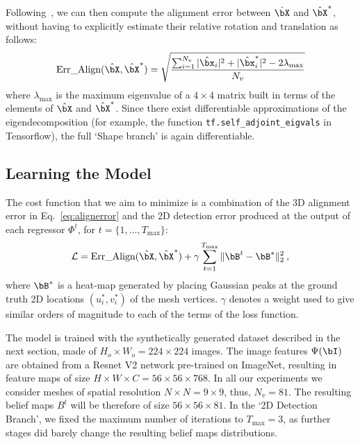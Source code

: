 \documentclass[10pt,twocolumn,letterpaper]{article}
\begin{document}
Following~\cite{coutsias2004using}, we can then compute the alignment error between $\hat{\bX}$ and $\hat{\bX}^*$, without having to explicitly estimate their relative rotation and translation as follows:
\begin{equation}
\textrm{Err\_Align}(\hat{\bX},\hat{\bX}^*) = \sqrt{\frac{\sum_{i=1}^{N_v} |\hat{\bx}_i|^2 + |\hat{\bx}_i^*|^2 - 2\lambda_{\textrm{max}}   }{N_v}}
\label{eq:alignerror}
\end{equation}
where $\lambda_{\textrm{max}}$ is the maximum eigenvalue of a $4\times 4$ matrix built in terms of the elements of $\hat{\bX}$ and $\hat{\bX}^*$.  Since there exist differentiable approximations of the eigendecomposition (for example, the function \texttt{tf.self\_adjoint\_eigvals} in Tensorflow), the full `Shape branch' is again differentiable.

\subsection{Learning the Model}
The cost function that we aim to minimize is a combination of the 3D alignment error in Eq.~\eqref{eq:alignerror} and the 2D detection error produced at the output of each regressor $\Phi^t$, for $t=\{1,\ldots,T_{\textrm{max}}\}$:
\begin{equation}
\mathcal{L}=\textrm{Err\_Align}(\hat{\bX},\hat{\bX}^*)+ \gamma \sum_{t=1}^{T_{\textrm{max}}}\|\bB^t-\bB^* \|_2^2 \> ,
\label{eq:loss}
\end{equation}
where $\bB^*$ is a heat-map generated by placing Gaussian peaks at the ground truth 2D locations $(u_i^*,v_i^*)$ of the mesh vertices. $\gamma$ denotes a weight used to give similar orders of magnitude to each of the terms of the loss function. 

\vspace{1mm}
 The model is trained with the synthetically generated dataset described in the next section, made of $H_o \times W_o = 224 \times 224$ images. 
The image features $\Psi(\bI)$ are obtained from a Resnet V2 network pre-trained on ImageNet, resulting in feature maps of size $H \times W \times C = 56 \times 56 \times 768$. In all our experiments we consider meshes of spatial resolution $N\times N = 9 \times 9$, thus, $N_v= 81$. The resulting belief maps $B^t$ will be therefore of size $56 \times 56 \times 81$. In the `2D Detection Branch', we fixed the maximum number of iterations to $T_{\textrm{max}}=3$, as further stages did barely change the resulting belief maps distributions. 
\end{document}
